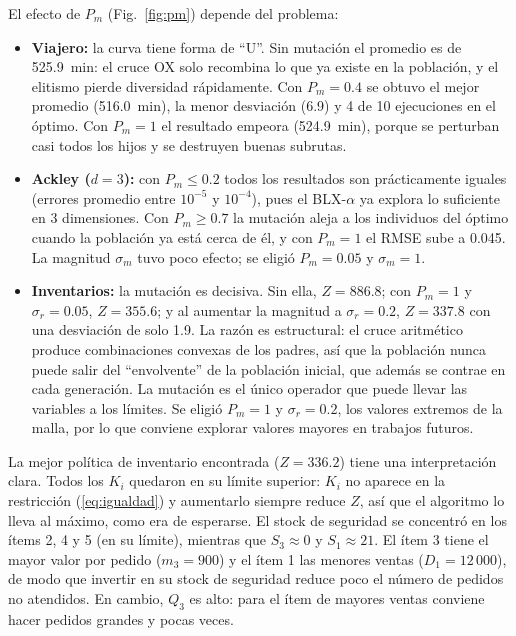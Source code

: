 \documentclass[conference]{IEEEtran}
\begin{document}
El efecto de $P_m$ (Fig.~\ref{fig:pm}) depende del problema:
\begin{itemize}
\item \textbf{Viajero:} la curva tiene forma de ``U''. Sin mutaci\'on el promedio es de 525.9~min: el cruce OX solo recombina lo que ya existe en la poblaci\'on, y el elitismo pierde diversidad r\'apidamente. Con $P_m=0.4$ se obtuvo el mejor promedio (516.0~min), la menor desviaci\'on (6.9) y 4 de 10 ejecuciones en el \'optimo. Con $P_m=1$ el resultado empeora (524.9~min), porque se perturban casi todos los hijos y se destruyen buenas subrutas.
\item \textbf{Ackley ($d=3$):} con $P_m\le0.2$ todos los resultados son pr\'acticamente iguales (errores promedio entre $10^{-5}$ y $10^{-4}$), pues el BLX-$\alpha$ ya explora lo suficiente en 3 dimensiones. Con $P_m\ge0.7$ la mutaci\'on aleja a los individuos del \'optimo cuando la poblaci\'on ya est\'a cerca de \'el, y con $P_m=1$ el RMSE sube a 0.045. La magnitud $\sigma_m$ tuvo poco efecto; se eligi\'o $P_m=0.05$ y $\sigma_m=1$.
\item \textbf{Inventarios:} la mutaci\'on es decisiva. Sin ella, $Z=886.8$; con $P_m=1$ y $\sigma_r=0.05$, $Z=355.6$; y al aumentar la magnitud a $\sigma_r=0.2$, $Z=337.8$ con una desviaci\'on de solo 1.9. La raz\'on es estructural: el cruce aritm\'etico produce combinaciones convexas de los padres, as\'i que la poblaci\'on nunca puede salir del ``envolvente'' de la poblaci\'on inicial, que adem\'as se contrae en cada generaci\'on. La mutaci\'on es el \'unico operador que puede llevar las variables a los l\'imites. Se eligi\'o $P_m=1$ y $\sigma_r=0.2$, los valores extremos de la malla, por lo que conviene explorar valores mayores en trabajos futuros.
\end{itemize}

La mejor pol\'itica de inventario encontrada ($Z=336.2$) tiene una interpretaci\'on clara. Todos los $K_i$ quedaron en su l\'imite superior: $K_i$ no aparece en la restricci\'on (\ref{eq:igualdad}) y aumentarlo siempre reduce $Z$, as\'i que el algoritmo lo lleva al m\'aximo, como era de esperarse. El stock de seguridad se concentr\'o en los \'items 2, 4 y 5 (en su l\'imite), mientras que $S_3\approx0$ y $S_1\approx21$. El \'item 3 tiene el mayor valor por pedido ($m_3=900$) y el \'item 1 las menores ventas ($D_1=12\,000$), de modo que invertir en su stock de seguridad reduce poco el n\'umero de pedidos no atendidos. En cambio, $Q_3$ es alto: para el \'item de mayores ventas conviene hacer pedidos grandes y pocas veces.
\end{document}
